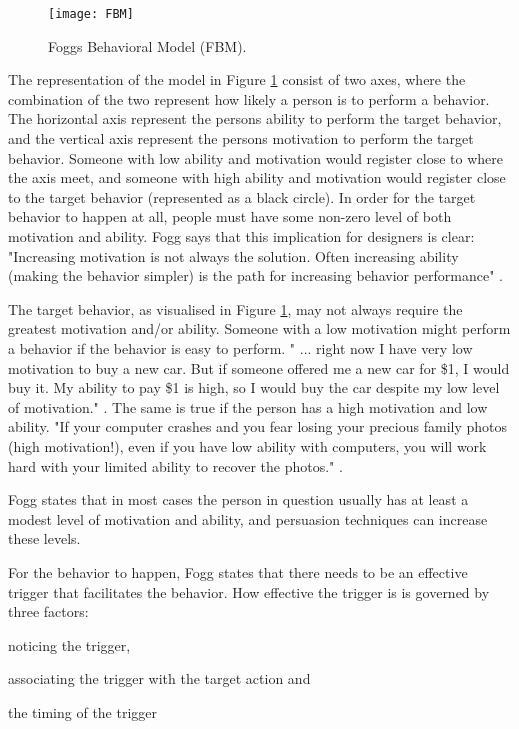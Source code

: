 \begin{figure}[h]
  \centering
    \texttt{[image: FBM]}
  \caption{Foggs Behavioral Model (FBM).}
  \label{fig:FBM}
\end{figure}

The representation of the model in Figure \ref{fig:FBM} consist of two axes, where the combination of the two represent how likely a person is to perform a behavior. The horizontal axis represent the persons ability to perform the target behavior, and the vertical axis represent the persons motivation to perform the target behavior. Someone with low ability and motivation would register close to where the axis meet, and someone with high ability and motivation would register close to the target behavior (represented as a black circle). In order for the target behavior to happen at all, people must have some non-zero level of both motivation and ability. Fogg says that this implication for designers is clear: "Increasing motivation is not always the solution. Often increasing ability (making the behavior simpler) is the path for increasing behavior performance" \cite{Fogg2009}.

The target behavior, as visualised in Figure \ref{fig:FBM}, may not always require the greatest motivation and/or ability. Someone with a low motivation might perform a behavior if the behavior is easy to perform. " ... right now I have very low motivation to buy a new car. But if someone offered me a new car for \$1, I would buy it. My ability to pay \$1 is high, so I would buy the car despite my low level of motivation." \cite{Fogg2009}. The same is true if the person has a high motivation and low ability. "If your computer crashes and you fear losing your precious family photos (high motivation!), even if you have low ability with computers, you will work hard with your limited ability to recover the photos." \cite{Fogg2009}.

Fogg states that in most cases the person in question usually has at least a modest level of motivation and ability, and persuasion techniques can increase these levels.

For the behavior to happen, Fogg states that there needs to be an effective trigger that facilitates the behavior. How effective the trigger is is governed by three factors: \begin{enumerate*}
  \item noticing the trigger,
  \item associating the trigger with the target action and
  \item the timing of the trigger
\end{enumerate*}

